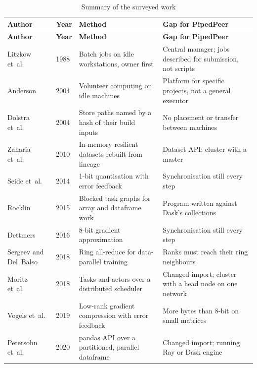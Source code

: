 {\renewcommand{\arraystretch}{1.1}
\footnotesize\singlespacing
\begin{longtable}{L{2.8cm} C{0.75cm} L{4.85cm} L{4.85cm}}
\caption{Summary of the surveyed work}
\label{tab:litsummary} \\
\toprule
\textbf{Author} & \textbf{Year} & \textbf{Method} & \textbf{Gap for PipedPeer} \\
\midrule
\endfirsthead
\toprule
\textbf{Author} & \textbf{Year} & \textbf{Method} & \textbf{Gap for PipedPeer} \\
\midrule
\endhead
\bottomrule
\endlastfoot
Litzkow et~al.\ \cite{litzkow1988condor} & 1988 & Batch jobs on idle workstations, owner first & Central manager; jobs described for submission, not scripts \\
Anderson \cite{anderson2004boinc} & 2004 & Volunteer computing on idle machines & Platform for specific projects, not a general executor \\
Dolstra et~al.\ \cite{dolstra2004nix} & 2004 & Store paths named by a hash of their build inputs & No placement or transfer between machines \\
Zaharia et~al.\ \cite{zaharia2010spark} & 2010 & In-memory resilient datasets rebuilt from lineage & Dataset API; cluster with a master \\
Seide et~al.\ \cite{seide2014onebit} & 2014 & 1-bit quantisation with error feedback & Synchronisation still every step \\
Rocklin \cite{rocklin2015dask} & 2015 & Blocked task graphs for array and dataframe work & Program written against Dask's collections \\
Dettmers \cite{dettmers2016eightbit} & 2016 & 8-bit gradient approximation & Synchronisation still every step \\
Sergeev and Del~Balso \cite{sergeev2018horovod} & 2018 & Ring all-reduce for data-parallel training & Ranks must reach their ring neighbours \\
Moritz et~al.\ \cite{moritz2018ray} & 2018 & Tasks and actors over a distributed scheduler & Changed import; cluster with a head node on one network \\
Vogels et~al.\ \cite{vogels2019powersgd} & 2019 & Low-rank gradient compression with error feedback & More bytes than 8-bit on small matrices \\
Petersohn et~al.\ \cite{petersohn2020modin} & 2020 & pandas API over a partitioned, parallel dataframe & Changed import; running Ray or Dask engine \\

\end{longtable}}
